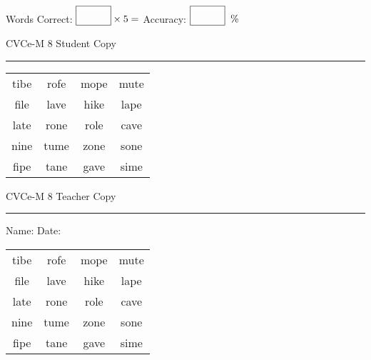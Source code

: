 \documentclass{memoir}
\begin{document}
\small

Words Correct: $\fbox{\phantom{\huge 100}} \times 5 = $ Accuracy: $\fbox{\phantom{\huge 100}}\;\; \%$ 

\vfill

\newpage


\footnotesize \noindent
CVCe-M 8 \hfill Student Copy
\smallskip
\hrule

\Large

\setlength{\tabcolsep}{14pt}
\def\arraystretch{2}

{\selectfont


\begin{vplace}[0.5]
\begin{center}
\begin{tabular}{cccc}
tibe & rofe & mope & mute \\
file & lave & hike & lape \\
late & rone & role & cave \\
nine & tume & zone & sone \\
fipe & tane & gave & sime \\
\end{tabular}
\end{center}
\end{vplace}

}

\newpage

\footnotesize \noindent
CVCe-M 8 \hfill Teacher Copy
\smallskip
\hrule

\small

\vfill

\noindent
Name: \underline{\hspace{1.75in}} \hfill Date: \underline{\hspace{1in}}

\Large

{\selectfont


\begin{vplace}[0.5]
\begin{center}
\begin{tabular}{cccc}
tibe & rofe & mope & mute \\
file & lave & hike & lape \\
late & rone & role & cave \\
nine & tume & zone & sone \\
fipe & tane & gave & sime \\
\end{tabular}
\end{center}
\end{vplace}



}
\end{document}
